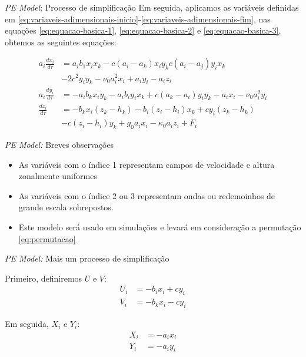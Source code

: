 \begin{frame}{\textit{PE Model}: Processo de simplificação}
    Em seguida, aplicamos as variáveis definidas em \eqref{eq:variaveis-adimensionais-inicio}-\eqref{eq:variaveis-adimensionais-fim}, nas equações \eqref{eq:equacao-basica-1}, \eqref{eq:equacao-basica-2} e \eqref{eq:equacao-basica-3}, obtemos as seguintes equações:

    \begin{small}
        \begin{align}
       a_i\frac{dx_i}{d\tau} &= a_ib_1x_ix_k - c(a_i - a_k)x_iy_k  c(a_i - a_j)y_ix_k\nonumber\\
       &-2c^2y_iy_k - \nu_0a_i^2x_i + a_iy_i - a_iz_i \label{eq:equacao-principal-1}\\
       a_i\frac{dy_i}{d\tau} &= -a_ib_kx_iy_k - a_ib_iy_ix_k + c(a_k - a_i)y_iy_k - a_ix_i - \nu_0a_i^2y_i \label{eq:equacao-principal-2}\\
       \frac{dz_i}{d\tau} &= -b_kx_i(z_k - h_k) - b_i(z_i - h_i)x_k + cy_i(z_k - h_k) \nonumber\\
       &- c(z_i - h_i)y_k + g_0a_ix_i - \kappa_0a_iz_i + F_i \label{eq:equacao-principal-3}
    \end{align}
    \end{small}
\end{frame}



\begin{frame}{\textit{PE Model:} Breves observações}

\begin{itemize}
    \item As variáveis com o índice 1 representam campos de velocidade e altura zonalmente uniformes

    \item As variáveis com o índice 2 ou 3 representam ondas ou redemoinhos de grande escala sobrepostos.

    \item Este modelo será usado em simulações e levará em consideração a permutação \eqref{eq:permutacao}
\end{itemize}
\end{frame}



\begin{frame}{\textit{PE Model:} Mais um processo de simplificação}

Primeiro, definiremos $U$ e $V$:
\begin{align}
   U_i &= -b_ix_i + cy_i \\
   V_i &= -b_kx_i - cy_i
\end{align}

Em seguida, $X_i$ e $Y_i$:
\begin{align}
    X_i &= -a_ix_i \\
    Y_i &= -a_iy_i
\end{align}

\end{frame}

